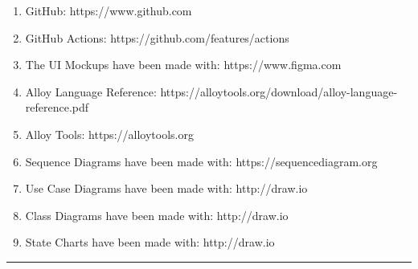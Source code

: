 \documentclass{Configuration_Files/Template}
\begin{document}
\begin{enumerate}
    \item GitHub: https://www.github.com
    \item GitHub Actions: https://github.com/features/actions
    \item The UI Mockups have been made with: https://www.figma.com
    \item Alloy Language Reference: https://alloytools.org/download/alloy-language-reference.pdf
    \item Alloy Tools: https://alloytools.org
    \item Sequence Diagrams have been made with: https://sequencediagram.org
    \item Use Case Diagrams have been made with: http://draw.io
    \item Class Diagrams have been made with: http://draw.io
    \item State Charts have been made with: http://draw.io
\end{enumerate}

{\color{bluepoli}\rule{\linewidth}{0.1pt}}
\end{document}
